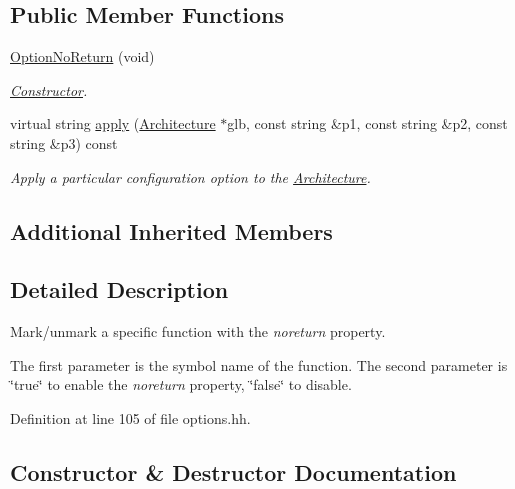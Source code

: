\subsection*{Public Member Functions}
\begin{DoxyCompactItemize}
\item 
\mbox{\hyperlink{class_option_no_return_a004d5c842575bc288cded652b1f531c2}{Option\+No\+Return}} (void)
\begin{DoxyCompactList}\small\item\em \mbox{\hyperlink{class_constructor}{Constructor}}. \end{DoxyCompactList}\item 
virtual string \mbox{\hyperlink{class_option_no_return_af92ab261861bf699b5ac1f775fc5029d}{apply}} (\mbox{\hyperlink{class_architecture}{Architecture}} $\ast$glb, const string \&p1, const string \&p2, const string \&p3) const
\begin{DoxyCompactList}\small\item\em Apply a particular configuration option to the \mbox{\hyperlink{class_architecture}{Architecture}}. \end{DoxyCompactList}\end{DoxyCompactItemize}
\subsection*{Additional Inherited Members}


\subsection{Detailed Description}
Mark/unmark a specific function with the {\itshape noreturn} property. 

The first parameter is the symbol name of the function. The second parameter is \char`\"{}true\char`\"{} to enable the {\itshape noreturn} property, \char`\"{}false\char`\"{} to disable. 

Definition at line 105 of file options.\+hh.



\subsection{Constructor \& Destructor Documentation}
\mbox{\label{class_option_no_return_a004d5c842575bc288cded652b1f531c2}} 
